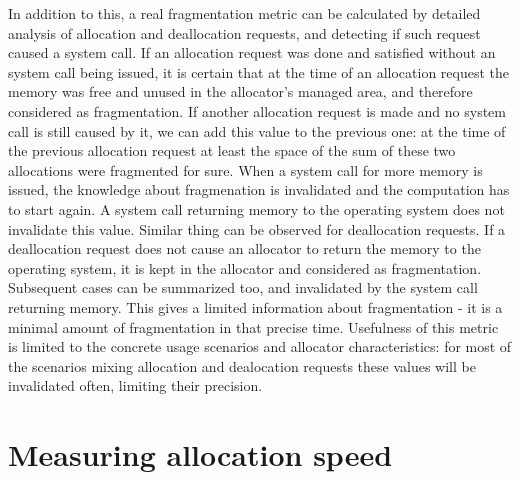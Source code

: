 In addition to this, a real fragmentation metric can be calculated by detailed
analysis of allocation and deallocation requests, and detecting if such request
caused a system call. If an allocation request was done and satisfied without an
system call being issued, it is certain that at the time of an allocation request
the memory was free and unused in the allocator's managed area, and therefore
considered as fragmentation. If another allocation request is made and no system
call is still caused by it, we can add this value to the previous one: at the
time of the previous allocation request at least the space of the sum of these
two allocations were fragmented for sure. When a system call for more memory is
issued, the knowledge about fragmenation is invalidated and the computation has
to start again. A system call returning memory to the operating system does not
invalidate this value. Similar thing can be observed for deallocation requests.
If a deallocation request does not cause an allocator to return the memory to the
operating system, it is kept in the allocator and considered as fragmentation.
Subsequent cases can be summarized too, and invalidated by the system call
returning memory. This gives a limited information about fragmentation - it is a
minimal amount of fragmentation in that precise time. Usefulness of this metric
is limited to the concrete usage scenarios and allocator characteristics: for
most of the scenarios mixing allocation and dealocation requests these values
will be invalidated often, limiting their precision.

\section{Measuring allocation speed}

